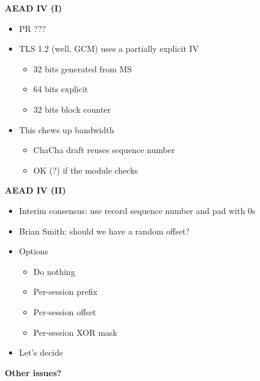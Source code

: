 \documentclass[helvetica]{seminar}
\newcommand{\heading}[1]{%
  \begin{center} 
    \large\bf 
    #1 
  \end{center} 
  \vspace{.4 in}}
\begin{document}
\begin{slide}
\heading{AEAD IV (I)}

\begin{itemize}
\item PR ???

\item TLS 1.2 (well, GCM) uses a partially explicit IV
  \begin{itemize}
  \item 32 bits generated from MS
  \item 64 bits explicit
  \item 32 bits block counter
  \end{itemize}

\item This chews up bandwidth
  \begin{itemize}
  \item ChaCha draft reuses sequence number
  \item OK (?) if the module checks
  \end{itemize}
\end{itemize}
\end{slide}


\begin{slide}
\heading{AEAD IV (II)}

\begin{itemize}
\item Interim consensus: use record sequence number and pad with 0s
\item Brian Smith: should we have a random offset?
\item Options
  \begin{itemize}
  \item Do nothing
  \item Per-session prefix
  \item Per-session offset
  \item Per-session XOR mask
  \end{itemize}

\item Let's decide
\end{itemize}
\end{slide}


\begin{slide}
\heading{Other issues?}

\end{slide}
\end{document}
